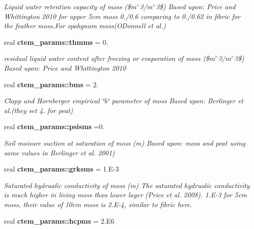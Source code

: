 \begin{DoxyCompactItemize}
\begin{DoxyCompactList}\small\item\em Liquid water retention capacity of moss (\$m$^\wedge$3/m$^\wedge$3\$) Based upon\+: Price and Whittington 2010 for upper 5cm moss 0./0.6 comparing to 0./0.62 in fibric for the feather moss.\+For spahgnum moss(O\textquotesingle{}Donnell et al.) \end{DoxyCompactList}\item 
\hypertarget{namespacectem__params_aab3a6d19ed64eb8eb8a8572cfcb79a09}{}real {\bfseries ctem\+\_\+params\+::thmms} = 0.\label{namespacectem__params_aab3a6d19ed64eb8eb8a8572cfcb79a09}

\begin{DoxyCompactList}\small\item\em residual liquid water content after freezing or evaporation of moss (\$m$^\wedge$3/m$^\wedge$3\$) Based upon\+: Price and Whittington 2010 \end{DoxyCompactList}\item 
\hypertarget{namespacectem__params_a234d2bebc16c2af4a065d245cc519881}{}real {\bfseries ctem\+\_\+params\+::bms} = 2.\label{namespacectem__params_a234d2bebc16c2af4a065d245cc519881}

\begin{DoxyCompactList}\small\item\em Clapp and Hornberger empirical \char`\"{}b\char`\"{} parameter of moss Based upon\+: Berlinger et al.(they set 4. for peat) \end{DoxyCompactList}\item 
\hypertarget{namespacectem__params_a2993e139bf7a155935eb4b98ebcdef6d}{}real {\bfseries ctem\+\_\+params\+::psisms} =0.\label{namespacectem__params_a2993e139bf7a155935eb4b98ebcdef6d}

\begin{DoxyCompactList}\small\item\em Soil moisure suction at saturation of moss (m) Based upon\+: moss and peat using same values in Berlinger et al. 2001) \end{DoxyCompactList}\item 
\hypertarget{namespacectem__params_a4d972097396638917b1af8258f5522ed}{}real {\bfseries ctem\+\_\+params\+::grksms} = 1.\+E-\/3\label{namespacectem__params_a4d972097396638917b1af8258f5522ed}

\begin{DoxyCompactList}\small\item\em Saturated hydrualic conductivity of moss (m) The saturated hydrualic conductivity is much higher in living moss than lower layer (Price et al. 2008). 1.\+E-\/3 for 5cm moss, their value of 10cm moss is 2.\+E-\/4, similar to fibric here. \end{DoxyCompactList}\item 
\hypertarget{namespacectem__params_a593ced8e0ba6323986268a82dd8e2932}{}real {\bfseries ctem\+\_\+params\+::hcpms} = 2.\+E6\label{namespacectem__params_a593ced8e0ba6323986268a82dd8e2932}


\end{DoxyCompactItemize}
